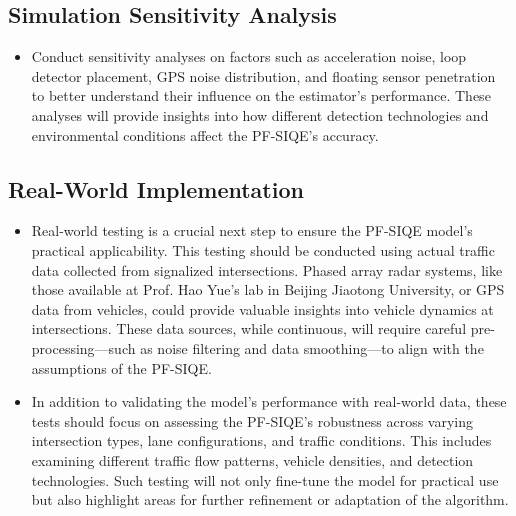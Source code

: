 \subsection{Simulation Sensitivity Analysis}
\begin{itemize}
    \item Conduct sensitivity analyses on factors such as acceleration noise, loop detector placement, GPS noise distribution, and floating sensor penetration to better understand their influence on the estimator’s performance. These analyses will provide insights into how different detection technologies and environmental conditions affect the PF-SIQE’s accuracy.
\end{itemize}

\subsection{Real-World Implementation}
\begin{itemize}
    \item Real-world testing is a crucial next step to ensure the PF-SIQE model’s practical applicability. This testing should be conducted using actual traffic data collected from signalized intersections. Phased array radar systems, like those available at Prof. Hao Yue's lab in Beijing Jiaotong University, or GPS data from vehicles, could provide valuable insights into vehicle dynamics at intersections. These data sources, while continuous, will require careful pre-processing—such as noise filtering and data smoothing—to align with the assumptions of the PF-SIQE.
    
    \item In addition to validating the model's performance with real-world data, these tests should focus on assessing the PF-SIQE’s robustness across varying intersection types, lane configurations, and traffic conditions. This includes examining different traffic flow patterns, vehicle densities, and detection technologies. Such testing will not only fine-tune the model for practical use but also highlight areas for further refinement or adaptation of the algorithm.
\end{itemize}














